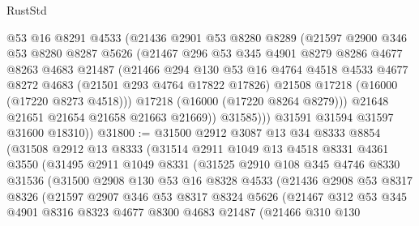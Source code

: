 \begin{lexlean}{RustStd}
\begin{coremodule}
              @53
              @16
              @8291
              @4533
              (@21436
                @2901
                @53
                @8280
                @8289
                (@21597
                  @2900
                  @346
                  @53
                  @8280
                  @8287
                  @5626
                  (@21467
                    @296
                    @53
                    @345
                    @4901
                    @8279
                    @8286
                    @4677
                    @8263
                    @4683
                    @21487
                    (@21466
                      @294
                      @130
                      @53
                      @16
                      @4764
                      @4518
                      @4533
                      @4677
                      @8272
                      @4683
                      (@21501 @293 @4764 @17822 @17826)
                      @21508
                      @17218
                      (@16000 (@17220 @8273 @4518)))
                    @17218
                    (@16000 (@17220 @8264 @8279)))
                  @21648
                  @21651
                  @21654
                  @21658
                  @21663
                  @21669))
              @31585)))
        @31591
        @31594
        @31597
        @31600
        @18310))
@31800 := @31500
    @2912
    @3087
    @13
    @34
    @8333
    @8854
    (@31508
      @2912
      @13
      @8333
      (@31514
        @2911
        @1049
        @13
        @4518
        @8331
        @4361
        @3550
        (@31495
          @2911
          @1049
          @8331
          (@31525
            @2910
            @108
            @345
            @4746
            @8330
            @31536
            (@31500
              @2908
              @130
              @53
              @16
              @8328
              @4533
              (@21436
                @2908
                @53
                @8317
                @8326
                (@21597
                  @2907
                  @346
                  @53
                  @8317
                  @8324
                  @5626
                  (@21467
                    @312
                    @53
                    @345
                    @4901
                    @8316
                    @8323
                    @4677
                    @8300
                    @4683
                    @21487
                    (@21466
                      @310
                      @130

\end{coremodule}
\end{lexlean}
